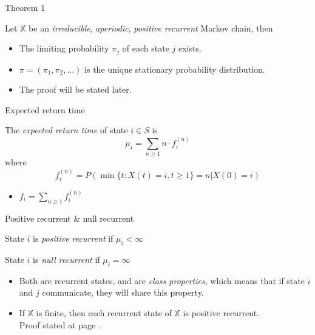 \documentclass{beamer}
\begin{document}
\begin{frame}{Theorem 1}
	\begin{theorem}
		Let $\mathbb{X}$ be an \textit{irreducible}, \textit{aperiodic}, \textit{positive recurrent} Markov chain, then
		\begin{itemize}
			\item The limiting probability $\pi_j$ of each state $j$ exists.
			\item $\pi = (\pi_1, \pi_2, \ldots)$ is the unique stationary probability distribution.
		\end{itemize}
	\end{theorem}
	\begin{itemize}
		\item The proof will be stated later.
	\end{itemize}
\end{frame}

\begin{frame}{Expected return time}
	\begin{definition}
		The \textit{expected return time} of state $i \in S$ is
		\[
		\mu_i = \sum_{n \geq 1} n \cdot f_i^{(n)}
		\]
		where
		\[
		f_i^{(n)} = P(\min\{t:X(t) = i, t\geq 1\} = n | X(0) = i)
		\]
	\end{definition}
	\begin{itemize}
		\item $f_i = \sum_{n \geq 1} f_i^{(n)}$
	\end{itemize}
\end{frame}

\begin{frame}{Positive recurrent \& null recurrent}
	\begin{definition}
		State $i$ is \textit{positive recurrent} if $\mu_i < \infty$
	\end{definition}
	\begin{definition}
		State $i$ is \textit{null recurrent} if $\mu_i = \infty$
	\end{definition}
	\begin{itemize}
		\item Both are recurrent states, and are \textit{class properties}, which means that if state $i$ and $j$ communicate, they will share this property.
		\item If $\mathbb{X}$ is finite, then each recurrent state of $\mathbb{X}$ is positive recurrent.\\
			Proof stated at page \pageref{finite_pos_rec}.
	\end{itemize}
\end{frame}
\end{document}
